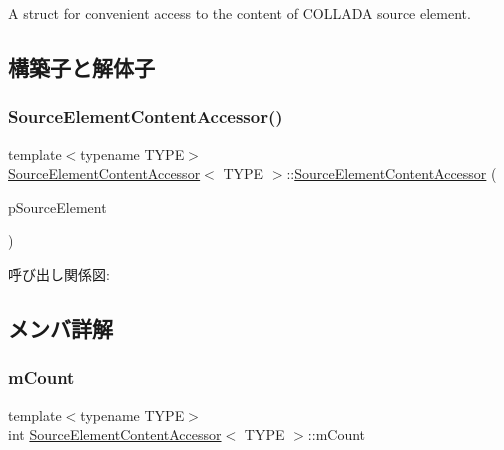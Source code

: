 A struct for convenient access to the content of C\+O\+L\+L\+A\+DA source element. 

\subsection{構築子と解体子}
\mbox{\label{struct_source_element_content_accessor_a6eb54cec39e924a3309beb5baefbde93}} 
\subsubsection{\texorpdfstring{Source\+Element\+Content\+Accessor()}{SourceElementContentAccessor()}}
{\footnotesize\ttfamily template$<$typename T\+Y\+PE$>$ \\
\hyperlink{struct_source_element_content_accessor}{Source\+Element\+Content\+Accessor}$<$ T\+Y\+PE $>$\+::\hyperlink{struct_source_element_content_accessor}{Source\+Element\+Content\+Accessor} (\begin{DoxyParamCaption}\item[{xml\+Node $\ast$}]{p\+Source\+Element }\end{DoxyParamCaption})}

呼び出し関係図\+:


\subsection{メンバ詳解}
\mbox{\label{struct_source_element_content_accessor_a21c1d4a1c15abe58b0fe1d4114c81f39}} 
\subsubsection{\texorpdfstring{m\+Count}{mCount}}
{\footnotesize\ttfamily template$<$typename T\+Y\+PE$>$ \\
int \hyperlink{struct_source_element_content_accessor}{Source\+Element\+Content\+Accessor}$<$ T\+Y\+PE $>$\+::m\+Count}

